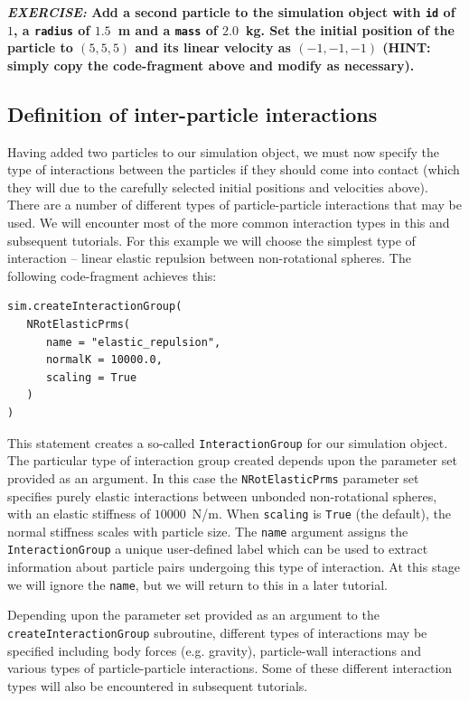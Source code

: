 \vskip 5mm
\noindent \textbf{\emph{EXERCISE:} Add a second particle to the simulation object with \texttt{id} of $1$, a \texttt{radius} of $1.5$~m and a \texttt{mass} of $2.0$~kg. Set the initial position of the particle to $(5,5,5)$ and its linear velocity as $(-1,-1,-1)$ (HINT: simply copy the code-fragment above and modify as necessary).}


\subsection{Definition of inter-particle interactions}

Having added two particles to our simulation object, we must now specify the type of interactions between the particles if they should come into contact (which they will due to the carefully selected initial positions and velocities above). There are a number of different types of particle-particle interactions that may be used. We will encounter most of the more common interaction types in this and subsequent tutorials. For this example we will choose the simplest type of interaction -- linear elastic repulsion between non-rotational spheres. The following code-fragment achieves this:

\begin{verbatim}
sim.createInteractionGroup(
   NRotElasticPrms(
      name = "elastic_repulsion",
      normalK = 10000.0,
      scaling = True
   )
)
\end{verbatim}

This statement creates a so-called \texttt{InteractionGroup} for our simulation object. The particular type of interaction group created depends upon the parameter set provided as an argument. In this case the \texttt{NRotElasticPrms} parameter set specifies purely elastic interactions between unbonded non-rotational spheres, with an elastic stiffness of $10000$~N/m.  When \texttt{scaling} is \texttt{True} (the default), the normal stiffness scales with particle size.  The \texttt{name} argument assigns the \texttt{InteractionGroup} a unique user-defined label which can be used to extract information about particle pairs undergoing this type of interaction. At this stage we will ignore the \texttt{name}, but we will return to this in a later tutorial.

Depending upon the parameter set provided as an argument to the \texttt{cre\+ateIn\+ter\+ac\+tionGroup} subroutine, different types of interactions may be specified including body forces (e.g. gravity), particle-wall interactions and various types of particle-particle interactions. Some of these different interaction types will also be encountered in subsequent tutorials.

